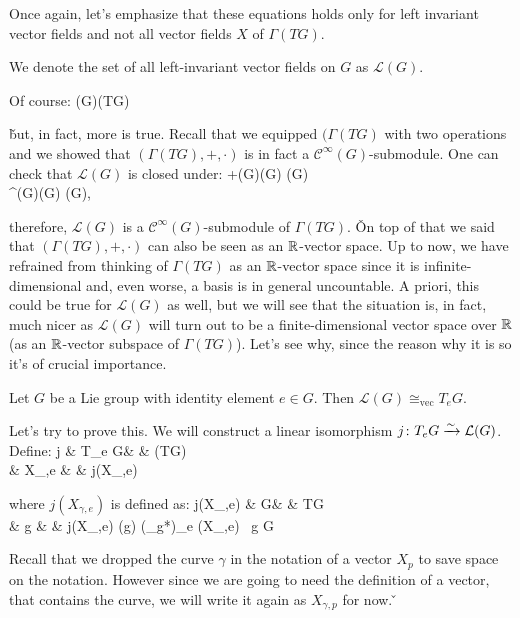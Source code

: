 Once again, let's emphasize that these equations holds only for left invariant vector fields and not all vector fields
$X$ of $\Gamma(TG)$.

We denote the set of all left-invariant vector fields on $G$ as $\mathcal{L} (G)$.
\ed

Of course:
\bse
{}(G)\se\Gamma(TG)
\ese

\v

but, in fact, more is true. Recall that we equipped $(\Gamma(TG)$ with two operations and we showed that
$(\Gamma(TG),+,\cdot)$ is in fact a $\mathcal{C}^\infty(G)$-submodule. One can check that $\mathcal{L}(G)$ is closed
under:
+\cl {}(G)\times {}(G) \to {}(G)\\
\cdot \cl {}^\infty(G)\times {}(G) \to {}(G),
\ei

therefore, $\mathcal{L}(G)$ is a $\mathcal{C}^\infty(G)$-submodule of $\Gamma(TG)$. \v

On top of that we said that $(\Gamma(TG),+,\cdot)$ can also be seen as an $\mathbb{R}$-vector space. Up to now, we have
refrained from thinking of $\Gamma(TG)$ as an $\mathbb{R}$-vector space since it is infinite-dimensional and, even worse, a
basis is in general uncountable. A priori, this could be true for $\mathcal{L}(G)$ as well, but we will see that the
situation is, in fact, much nicer as $\mathcal{L}(G)$ will turn out to be a finite-dimensional vector space over $\mathbb{R}$
(as an $\mathbb{R}$-vector subspace of $\Gamma(TG)$). Let's see why, since the reason why it is so it's of crucial importance.

\bt[]
Let $G$ be a Lie group with identity element $e\in G$. Then $\mathcal{L}(G) \cong_\mathrm{vec} T_e G$.
\et

Let's try to prove this. We will construct a linear isomorphism $j\colon T_e G\xrightarrow{\sim}\mathcal{L}(G)$. Define:
j \cl & T_e G& \to & \Gamma(TG) \\ & X_{\gamma,e} & \mapsto & j(X_{\gamma,e})
\ei

where $j(X_{\gamma,e})$ is defined as:
j(X_{\gamma,e}) \cl & G& \to & TG\\
& g & \mapsto & j(X_{\gamma,e}) (g) \coloneqq ({\ell_{g*}})_e (X_{\gamma,e}) \, \forall g \in G
\ei

Recall that we dropped the curve $\gamma$ in the notation of a vector $X_p$ to save space on the notation. However
since we are going to need the definition of a vector, that contains the curve, we will write it again as $X_{\gamma,
p}$ for now. \v

